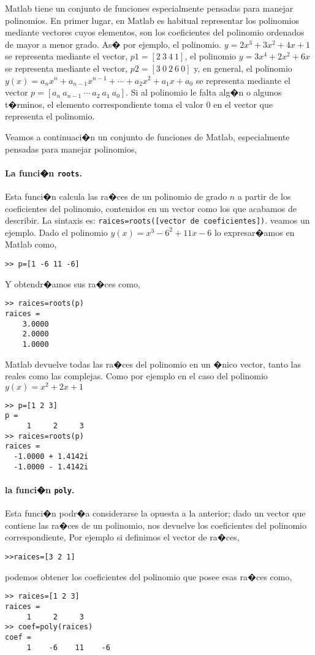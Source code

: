 Matlab tiene un conjunto de funciones especialmente pensadas para  manejar polinomios. En primer lugar, en Matlab es habitual representar los polinomios mediante vectores cuyos elementos, son los coeficientes del polinomio ordenados de mayor a menor grado. As� por ejemplo, el polinomio. $y=2x^3+3x^2+4x+1$ se representa mediante el vector, $p1=[2\ 3\ 4\ 1]$,  el polinomio $y=3x^4+2x^2+6x$ se representa mediante el vector,  $p2=[3\ 0\ 2\ 6\ 0]$ y, en general, el polinomio $y(x)=a_nx^n+a_{n-1}x^{n-1}+\cdots+a_2x^2+a_1x+a_0$  se representa mediante el vector $p=[a_n\ a_{n-1}\ \cdots\ a_2\ a_1\ a_0]$. Si al polinomio le falta alg�n o algunos t�rminos, el elemento correspondiente toma el valor $0$ en el vector que representa el polinomio.

Veamos a continuaci�n un conjunto de funciones de Matlab, especialmente pensadas para manejar polinomios,

\paragraph{La funci�n \texttt{roots}.} Esta funci�n calcula las ra�ces de un polinomio de grado $n$ a partir de los coeficientes del polinomio, contenidos en un vector como los que acabamos de describir. La sintaxis es: \texttt{raices=roots([vector de coeficientes])}. veamos un ejemplo. Dado el polinomio $y(x)=x^3-6^2+11x-6$ lo expresar�amos en Matlab como,

\begin{verbatim}
>> p=[1 -6 11 -6]
\end{verbatim}

Y obtendr�amos sus ra�ces como,

\begin{verbatim}
>> raices=roots(p)
raices =
    3.0000
    2.0000
    1.0000

\end{verbatim}

Matlab devuelve todas las ra�ces del polinomio en un �nico vector, tanto las reales como las complejas. Como por ejemplo en el caso del polinomio $y(x)=x^2+2x+1$

\begin{verbatim}
>> p=[1 2 3]
p =
     1     2     3
>> raices=roots(p)
raices =
  -1.0000 + 1.4142i
  -1.0000 - 1.4142i
\end{verbatim}

\paragraph{la funci�n \texttt{poly}.} Esta funci�n podr�a considerarse la opuesta a la anterior; dado un vector que contiene las ra�ces de un polinomio, nos devuelve los coeficientes del polinomio correspondiente, Por ejemplo si definimos el vector de ra�ces, 
\begin{verbatim}
>>raices=[3 2 1]
\end{verbatim}
podemos obtener los coeficientes del polinomio que posee esas ra�ces como,
\begin{verbatim}
>> raices=[1 2 3]
raices =
     1     2     3
>> coef=poly(raices)
coef =
     1    -6    11    -6
\end{verbatim}

